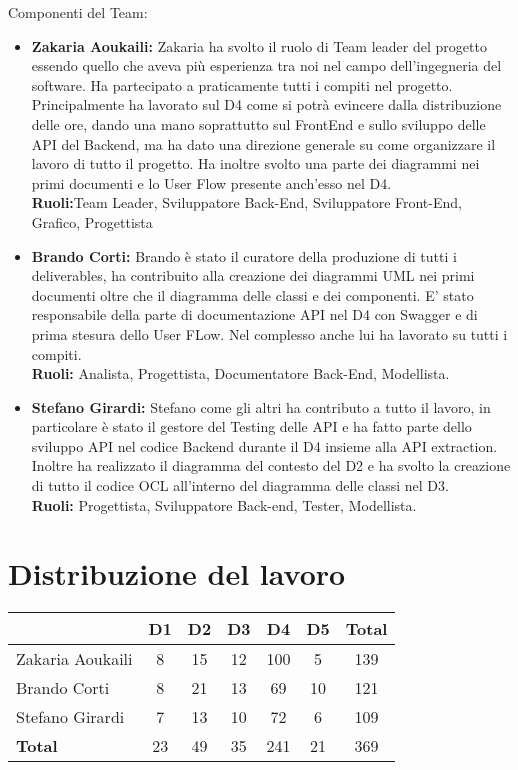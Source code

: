 \documentclass{article}
\begin{document}
Componenti del Team:
\begin{itemize}
    \item \textbf{Zakaria Aoukaili:} Zakaria ha svolto il ruolo di Team leader del progetto essendo quello che aveva più esperienza tra noi nel campo dell'ingegneria del software. Ha partecipato a praticamente tutti i compiti nel progetto. Principalmente ha lavorato sul D4 come si potrà evincere dalla distribuzione delle ore, dando una mano soprattutto sul FrontEnd e sullo sviluppo delle API del Backend, ma ha dato una direzione generale su come organizzare il lavoro di tutto il progetto.
    Ha inoltre svolto una parte dei diagrammi nei primi documenti e lo User Flow presente anch'esso nel D4.\\
    
    \textbf{Ruoli:}Team Leader, Sviluppatore Back-End, Sviluppatore Front-End, Grafico, Progettista
        
    \item \textbf{Brando Corti:} Brando è stato il curatore della produzione di tutti i deliverables, ha contribuito alla creazione dei diagrammi UML nei primi documenti oltre che il diagramma delle classi e  dei componenti. E' stato responsabile della parte di documentazione API nel D4 con Swagger e di prima stesura dello User FLow. Nel complesso anche lui ha lavorato su tutti i compiti.\\
    
    \textbf{Ruoli:} Analista, Progettista, Documentatore Back-End, Modellista.
    \item \textbf{Stefano Girardi:} Stefano come gli altri ha contributo a tutto il lavoro, in particolare è stato il gestore del Testing delle API e ha fatto parte dello sviluppo API nel codice Backend durante il D4 insieme alla API extraction. Inoltre ha realizzato il diagramma del contesto del D2  e ha svolto  la creazione di tutto il  codice OCL all'interno del diagramma delle classi nel D3.\\
    
    \textbf{Ruoli:} Progettista, Sviluppatore Back-end, Tester, Modellista.
    
\end{itemize}

\newpage

\section{Distribuzione del lavoro}

\begin{table}[H]
\centering
\begin{tabular}{|l|*{5}{c|}|c|}
\hline
\textbf{} & \textbf{D1} & \textbf{D2} & \textbf{D3} & \textbf{D4} & \textbf{D5} & \textbf{Total} \\
\hline
Zakaria Aoukaili & 8 & 15 & 12 & 100 & 5 & 139 \\
Brando Corti & 8 & 21 & 13 & 69 & 10 & 121 \\
Stefano Girardi & 7 & 13 & 10 & 72 & 6 & 109 \\
\hline
\textbf{Total} & 23 & 49 & 35 & 241 & 21 & 369 \\
\hline
\end{tabular}
\end{table}
\end{document}
